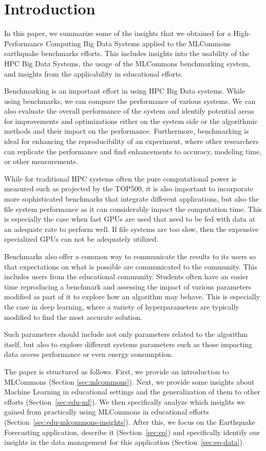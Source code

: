 \documentclass[utf8]{FrontiersinVancouver} %
\begin{document}
\section{Introduction}

In this paper, we summarize some of the insights that we obtained for
a High-Performance Computing Big Data Systems applied to the MLCommons
earthquake benchmarks efforts. This includes insights into the
usability of the HPC Big Data Systems, the usage of the MLCommons
benchmarking system, and insights from the applicability in
educational efforts.

Benchmarking is an important effort in using HPC Big Data systems.
While using benchmarks, we can compare the performance of various
systems. We can also evaluate the overall performance of the system
and identify potential areas for improvements and optimizations either
on the system side or the algorithmic methods and their impact on the
performance. Furthermore, benchmarking is ideal for enhancing the
reproducibility of an experiment, where other researchers can
replicate the performance and find enhancements to accuracy, modeling
time, or other measurements.

While for traditional HPC systems often the pure computational power
is measured such as projected by the TOP500, it is also important to
incorporate more sophisticated benchmarks that integrate different
applications, but also the file system performance as it can
considerably impact the computation time. This is especially the case
when fast GPUs are used that need to be fed with data at an adequate
rate to perform well. If file systems are too slow, then the expensive
specialized GPUs can not be adequately utilized.

Benchmarks also offer a common way to communicate the results to its
users so that expectations on what is possible are communicated to the
community. This includes users from the educational
community. Students often have an easier time reproducing a benchmark
and assessing the impact of various parameters modified as part of it
to explore how an algorithm may behave. This is especially the case in
deep learning, where a variety of hyperparameters are typically
modified to find the most accurate solution.

Such parameters should include not only parameters related to
the algorithm itself, but also to explore different systems parameters
such as those impacting data access performance or even energy
consumption.

The paper is structured as follows. First, we provide an introduction
to MLCommons (Section \ref{sec:mlcommons}).  Next, we provide some
insights about Machine Learning in educational settings and the
generalization of them to other efforts (Section~\ref{sec:edu-ml}). We
then specifically analyze which insights we gained from practically
using MLCommons in educational efforts
(Section~\ref{sec:edu-mlcommons-insights}). After this, we focus on
the Earthquake Forecasting application, describe it
(Section~\ref{sec:eq}) and specifically identify our insights in the
data management for this application (Section~\ref{sec:eq-data}).
\end{document}
